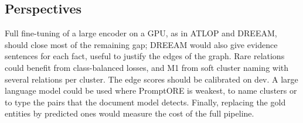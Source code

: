 \documentclass[pdflatex,sn-mathphys-num]{sn-jnl}
\begin{document}
\subsection{Perspectives}

Full fine-tuning of a large encoder on a GPU, as in ATLOP and DREEAM, should close most of the remaining gap; DREEAM would also give evidence sentences for each fact, useful to justify the edges of the graph. Rare relations could benefit from class-balanced losses, and M1 from soft cluster naming with several relations per cluster. The edge scores should be calibrated on dev. A large language model could be used where PromptORE is weakest, to name clusters or to type the pairs that the document model detects. Finally, replacing the gold entities by predicted ones would measure the cost of the full pipeline.


\end{document}
